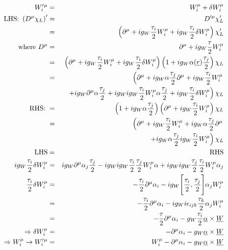 \begin{eqnarray*}
  W'_i{}^{\mu} & = & W_i^{\mu} + \delta W_i^{\mu} \\
  \textrm{LHS: } \left(D^{\mu}\chi_L\right)' & = & D'^{\mu}\chi'_L \\
  & = & \left(\partial^{\mu} + ig_W \frac{\tau_i}{2}W_i^{\mu} + ig_W\frac{\tau_i}{2}\delta W_i^{\mu}\right)\chi'_L \\
  \textrm{where } D^{\mu} & = & \partial^{\mu} + ig_W\frac{\tau}{2}W_i^{\mu} \\
  & = & \left(\partial^{\mu} + ig_W\frac{\tau_i}{2}W_i^{\mu} + ig_W\frac{\tau_i}{2}\delta W_i^{\mu}\right) \left(1 + ig_W\alpha(\underline{r})\frac{\tau_j}{2}\right)\chi_L \\
  & = & \left( \partial^{\mu} + ig_W\alpha\frac{\tau_j}{2}\partial^{\mu} + ig_W\frac{\tau_i}{2}W_i^{\mu} \right.\\
  & & \left.+ ig_W\partial^{\mu}\alpha\frac{\tau_j}{2} + ig_W ig_W \frac{\tau_i}{2}W_i^{\mu}\alpha\frac{\tau_j}{2} + ig_W\frac{\tau_i}{2}\delta W_i^{\mu}\right)\chi_L \\
  \textrm{RHS: } & = & \left(1 + ig_W\alpha\frac{\tau_j}{2}\right)\left(\partial^{\mu} + ig_W\frac{\tau_i}{2}W_i^{\mu}\right)\chi_L \\
  & = & \left(\partial^{\mu} + ig_W\frac{\tau_i}{2}W_i^{\mu} + ig_W\alpha\frac{\tau_j}{2}\partial^{\mu} \right.\\
  & & \left.+ ig_W\alpha\frac{\tau_j}{2}ig_W\frac{\tau_i}{2}W_i^{\mu}\right)\chi_L \\
  \textrm{LHS} & = & \textrm{RHS} \\
  ig_W\frac{\tau_i}{2}\delta W_i^{\mu} & = & ig_W\partial^{\mu}\alpha_j\frac{\tau_j}{2} - ig_Wig_W\frac{\tau_i}{2}\frac{\tau_j}{2}W_i^{\mu}\alpha + ig_Wig_W\frac{\tau_j}{2}\frac{\tau_i}{2}W_i^{\mu}\alpha_j \\
  \frac{\tau_i}{2}\delta W_i^{\mu} & = & -\frac{\tau_i}{2}\partial^{\mu}\alpha_i - ig_W\Bigg[\frac{\tau_i}{2},\frac{\tau_j}{2}\Bigg]\alpha_jW_i^{\mu} \\
  & = & -\frac{\tau_i}{2}\partial^{\mu}\alpha_i - ig_Wi\epsilon_{ijk}\frac{\tau_k}{2}\alpha_jW_i^{\mu} \\
  & = & -\frac{\tau}{2}\partial^{\mu}\alpha_i - g_W\frac{\tau_i}{2}\underline{\alpha}\times\underline{W} \\
  \Rightarrow \delta W_i^{\mu} & = & -\partial^{\mu}\alpha_i - g_W\underline{\alpha}\times\underline{W} \\
  \Rightarrow W_i^{\mu} \to W'_i{}^{\mu} & = & W_i^{\mu} - \partial^{\mu}\alpha_i - g_W \underline{\alpha}\times\underline{W}
\end{eqnarray*}


